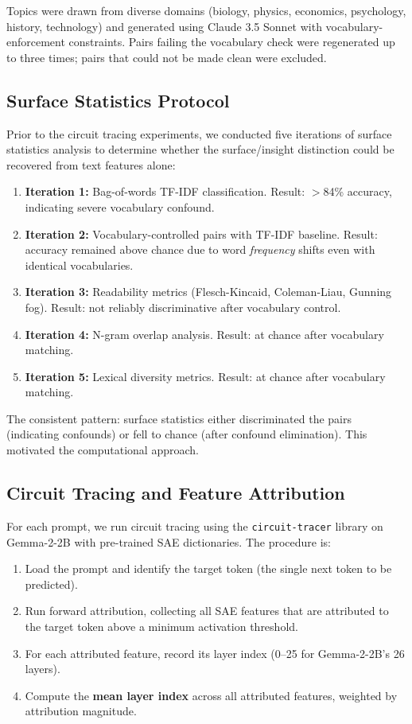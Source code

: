 \documentclass[10pt]{article}
\begin{document}
Topics were drawn from diverse domains (biology, physics, economics, psychology, history, technology) and generated using Claude 3.5 Sonnet with vocabulary-enforcement constraints. Pairs failing the vocabulary check were regenerated up to three times; pairs that could not be made clean were excluded.

\subsection{Surface Statistics Protocol}
\label{sec:surface_stats}

Prior to the circuit tracing experiments, we conducted five iterations of surface statistics analysis to determine whether the surface/insight distinction could be recovered from text features alone:

\begin{enumerate}
    \item \textbf{Iteration 1:} Bag-of-words TF-IDF classification. Result: $>$84\% accuracy, indicating severe vocabulary confound.
    \item \textbf{Iteration 2:} Vocabulary-controlled pairs with TF-IDF baseline. Result: accuracy remained above chance due to word \textit{frequency} shifts even with identical vocabularies.
    \item \textbf{Iteration 3:} Readability metrics (Flesch-Kincaid, Coleman-Liau, Gunning fog). Result: not reliably discriminative after vocabulary control.
    \item \textbf{Iteration 4:} N-gram overlap analysis. Result: at chance after vocabulary matching.
    \item \textbf{Iteration 5:} Lexical diversity metrics. Result: at chance after vocabulary matching.
\end{enumerate}

The consistent pattern: surface statistics either discriminated the pairs (indicating confounds) or fell to chance (after confound elimination). This motivated the computational approach.

\subsection{Circuit Tracing and Feature Attribution}
\label{sec:circuit_tracing}

For each prompt, we run circuit tracing using the \texttt{circuit-tracer} library on Gemma-2-2B with pre-trained SAE dictionaries. The procedure is:

\begin{enumerate}
    \item Load the prompt and identify the target token (the single next token to be predicted).
    \item Run forward attribution, collecting all SAE features that are attributed to the target token above a minimum activation threshold.
    \item For each attributed feature, record its layer index (0--25 for Gemma-2-2B's 26 layers).
    \item Compute the \textbf{mean layer index} across all attributed features, weighted by attribution magnitude.
\end{enumerate}
\end{document}
